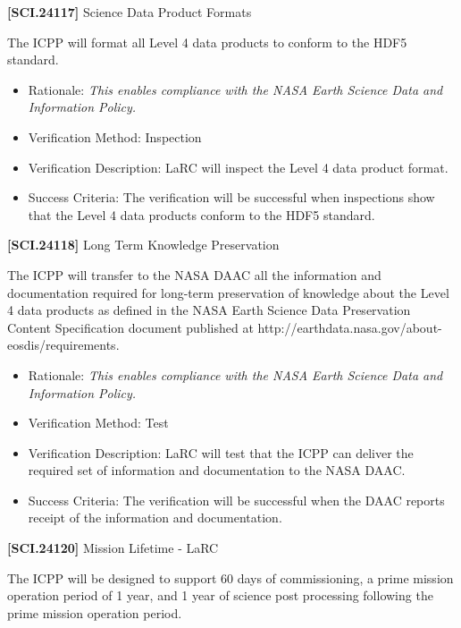 \documentclass[12pt,oneside,oldfontcommands]{memoir}
\begin{document}
\textbf{[SCI.24117]} Science Data Product Formats

The \gls{ICPP} will format all Level 4 data products to conform to the HDF5 standard.

\begin{itemize}
\item{} Rationale: \emph{This enables compliance with the NASA Earth Science Data and Information Policy.}

\item{} Verification Method: Inspection

\item{} Verification Description: \gls{LaRC} will inspect the Level 4 data product format.

\item{} Success Criteria: The verification will be successful when \gls{inspection}s show that the Level 4 data products conform to the HDF5 standard.

\end{itemize}

\textbf{[SCI.24118]} Long Term Knowledge Preservation

The \gls{ICPP} will transfer to the NASA \gls{DAAC} all the information and documentation required for long-term preservation of knowledge about the Level 4 data products as defined in the NASA Earth Science Data Preservation Content Specification document published at http:\slash \slash earthdata.nasa.gov\slash about-eosdis\slash requirements.

\begin{itemize}
\item{} Rationale: \emph{This enables compliance with the NASA Earth Science Data and Information Policy.}

\item{} Verification Method: Test

\item{} Verification Description: \gls{LaRC} will \gls{test} that the \gls{ICPP} can deliver the required set of information and documentation to the NASA \gls{DAAC}.

\item{} Success Criteria: The verification will be successful when the \gls{DAAC} reports receipt of the information and documentation.

\end{itemize}

\textbf{[SCI.24120]} Mission Lifetime - \gls{LaRC}

The \gls{ICPP} will be designed to support 60 days of commissioning, a prime mission operation period of 1 year, and 1 year of science post processing following the prime mission operation period.
\end{document}
